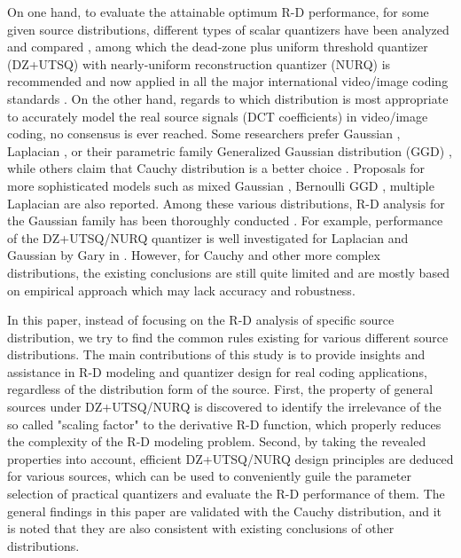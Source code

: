 \documentclass[smallabstract,smallcaptions]{dccpaper}
\begin{document}
On one hand, to evaluate the attainable optimum R-D performance, for some given source distributions, different types of scalar quantizers have been analyzed and compared \cite{Sullivan_TIT1996}, among which the dead-zone plus uniform threshold quantizer (DZ+UTSQ) with nearly-uniform reconstruction quantizer (NURQ) is recommended and now applied in all the major international video/image coding standards \cite{Sullivan_VCIP2005}. On the other hand, regards to which distribution is most appropriate to accurately model the real source signals (DCT coefficients) in video/image coding, no consensus is ever reached. Some researchers prefer Gaussian \cite{Pratt_Wiley1978}, Laplacian \cite{Smooth_SPIE1996}, or their parametric family Generalized Gaussian distribution (GGD) \cite{Farvardin_TIT1984} \cite{Sun_TCSVT2009}, while others claim that Cauchy distribution is a better choice \cite{Kamaci_TCSVT2005} \cite{Rodríguez_TCSVT_2010}. Proposals for more sophisticated models such as mixed Gaussian \cite{Eude_ICASSP1994}, Bernoulli GGD \cite{Fraysse_TIT2009}, multiple Laplacian \cite{Lee_TCSVT2014} are also reported. Among these various distributions, R-D analysis for the Gaussian family has been thoroughly conducted \cite{Sun_2013TIP}. For example, performance of the DZ+UTSQ/NURQ quantizer is well investigated for Laplacian and Gaussian by Gary in \cite{Sullivan_VCIP2005}. However, for Cauchy and other more complex distributions, the existing conclusions are still quite limited and are mostly based on empirical approach which may lack accuracy and robustness.

In this paper, instead of focusing on the R-D analysis of specific source distribution, we try to find the common rules existing for various different source distributions. The main contributions of this study is to provide insights and assistance in R-D modeling and quantizer design for real coding applications, regardless of the distribution form of the source. First, the property of general sources under DZ+UTSQ/NURQ is discovered to identify the irrelevance of the so called "scaling factor" to the derivative R-D function, which properly reduces the complexity of the R-D modeling problem. Second, by taking the revealed properties into account, efficient DZ+UTSQ/NURQ design principles are deduced for various sources, which can be used to conveniently guile the parameter selection of practical quantizers and evaluate the R-D performance of them.
The general findings in this paper are validated with the Cauchy distribution, and it is noted that they are also consistent with existing conclusions of other distributions.
\end{document}
